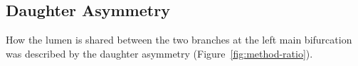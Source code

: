 \subsection{Daughter Asymmetry}
\label{sec:method-ratio}

How the lumen is shared between the two branches at the left main bifurcation was described by the daughter asymmetry (Figure~\ref{fig:method-ratio}).

